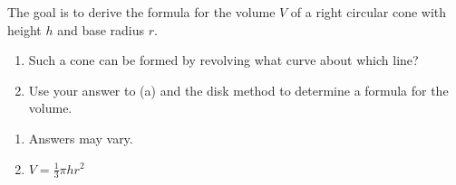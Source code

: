 {The goal is to derive the formula for the volume $V$ of a right circular cone with height $h$ and base radius $r$.
\begin{enumerate}
\item Such a cone can be formed by revolving what curve about which line?
\item Use your answer to (a) and the disk method to determine a formula for the volume.
\end{enumerate}
}
{\begin{enumerate}
\item Answers may vary.
\item $V=\frac{1}{3}\pi h r^2$
\end{enumerate}
}
